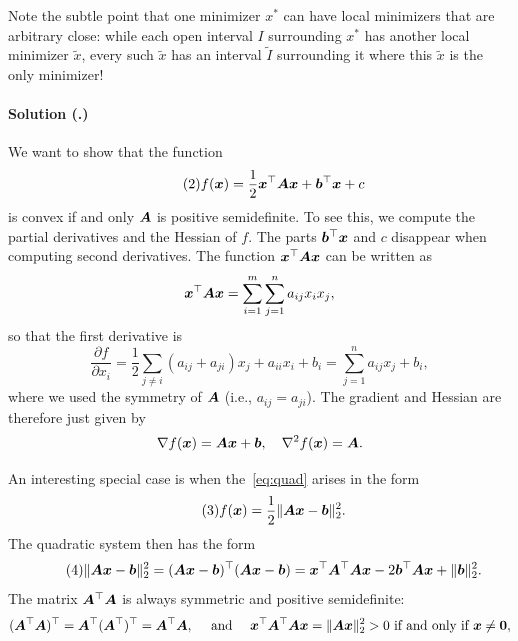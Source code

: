 \documentclass{article}
\newcounter{problemSheetNumber}
\newcounter{problems}
\renewcommand{\solution}[1]{\paragraph{Solution (\theproblemSheetNumber.\theproblems)}\addtocounter{problems}{1}\label{#1}}
\begin{document}
\begin{itemize}
Note the subtle point that one minimizer $x^*$ can have local minimizers that are arbitrary close: while each open interval $I$ surrounding $x^*$ has another local minimizer $\tilde{x}$, every such $\tilde{x}$ has an interval $\tilde{I}$ surrounding it where this $\tilde{x}$ is the only minimizer!
\end{itemize}


\solution{pr:2} We want to show that the function
\begin{equation}\label{eq:quad}\tag{2}
f(\bm{x}) = \frac{1}{2}\bm{x}^{\top}\bm{A}\bm{x}+\bm{b}^{\top}\bm{x}+c  
 \end{equation}
is convex if and only $\bm{A}$ is positive semidefinite.
To see this, we compute the partial derivatives and the Hessian of $f$. The parts $\bm{b}^{\top}\bm{x}$ and $c$ disappear when computing second derivatives. The function $\bm{x}^{\top}\bm{A}\bm{x}$ can be written as
\begin{equation*}
 \bm{x}^{\top}\bm{A}\bm{x} = \sum_{i=1}^m\sum_{j=1}^n a_{ij}x_ix_j,
\end{equation*}
so that the first derivative is
\begin{equation*}
 \frac{\partial f}{\partial x_i} = \frac{1}{2} \sum_{j\neq i} (a_{ij}+a_{ji}) x_j + a_{ii}x_i+b_i = \sum_{j=1}^n a_{ij}x_j+b_i,
\end{equation*}
where we used the symmetry of $\bm{A}$ (i.e., $a_{ij}=a_{ji}$). The gradient and Hessian are therefore just given by
\begin{equation*}
 \nabla f(\bm{x}) = \bm{A}\bm{x}+\bm{b}, \quad \nabla^2f(\bm{x}) = \bm{A}.
\end{equation*}

An interesting special case is when the~\eqref{eq:quad} arises in the form
\begin{equation}\label{eq:least}\tag{3}
 f(\bm{x}) = \frac{1}{2}\Vert {\bm{A}\bm{x}-\bm{b}}\Vert_2^2. 
\end{equation}
The quadratic system then has the form
\begin{equation}\label{eq:normquad}\tag{4}
 \Vert {\bm{A}\bm{x}-\bm{b}}\Vert_2^2 = (\bm{A}\bm{x}-\bm{b})^{\top}(\bm{A}\bm{x}-\bm{b}) = \bm{x}^{\top}\bm{A}^{\top}\bm{A}\bm{x}-2\bm{b}^{\top}\bm{A}\bm{x}+\Vert {\bm{b}}\Vert_2^2.
\end{equation}
The matrix $\bm{A}^{\top}\bm{A}$ is always symmetric and positive semidefinite:
\begin{equation*}
 (\bm{A}^{\top}\bm{A})^{\top} = \bm{A}^{\top}(\bm{A}^{\top})^{\top} = \bm{A}^{\top}\bm{A}, \quad \text{ and } \quad \bm{x}^{\top}\bm{A}^\top\bm{A}\bm{x} = \Vert {\bm{A}\bm{x}}\Vert_2^2>0 \text{ if and only if } \bm{x}\neq \bm{0},
\end{equation*}
\end{document}
